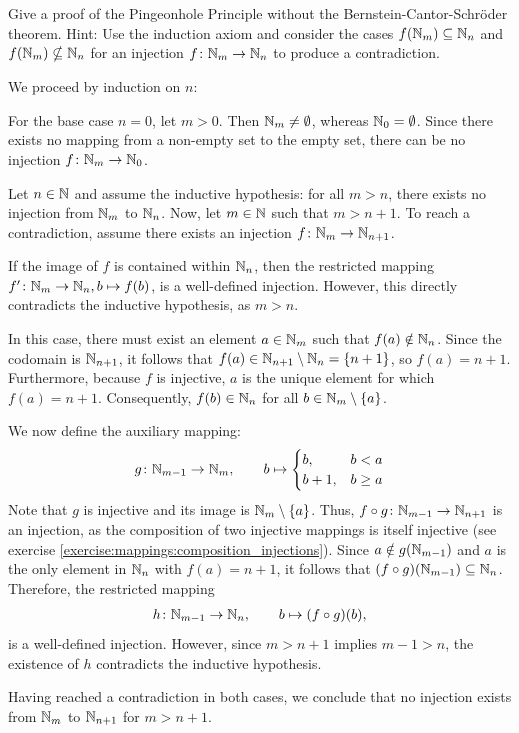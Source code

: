 \begin{exercise}\label{exercise:finite_infinite:pigeonhole_principle}
    Give a proof of the Pingeonhole Principle without the Bernstein-Cantor-Schröder theorem. Hint: Use the induction axiom and consider the cases $f(\mathbb{N}_m)\subseteq\mathbb{N}_n$ and $f(\mathbb{N}_m)\nsubseteq\mathbb{N}_n$ for an injection $f\colon\mathbb{N}_m\to\mathbb{N}_n$ to produce a contradiction.
\end{exercise}

\begin{solution}
    We proceed by induction on $n$:

     For the base case $n=0$, let $m > 0$. Then $\mathbb{N}_m \neq \emptyset$, whereas $\mathbb{N}_0 = \emptyset$. Since there exists no mapping from a non-empty set to the empty set, there can be no injection $f \colon \mathbb{N}_m \to \mathbb{N}_0$.
    
     Let $n \in \mathbb{N}$ and assume the inductive hypothesis: for all $m > n$, there exists no injection from $\mathbb{N}_m$ to $\mathbb{N}_n$. Now, let $m \in \mathbb{N}$ such that $m > n+1$. To reach a contradiction, assume there exists an injection $f \colon \mathbb{N}_m \to \mathbb{N}_{n+1}$.
    
    If the image of $f$ is contained within $\mathbb{N}_n$, then the restricted mapping $f' \colon \mathbb{N}_m \to \mathbb{N}_n, b \mapsto f(b)$, is a well-defined injection. However, this directly contradicts the inductive hypothesis, as $m > n$.
    
     In this case, there must exist an element $a \in \mathbb{N}_m$ such that $f(a) \notin \mathbb{N}_n$. Since the codomain is $\mathbb{N}_{n+1}$, it follows that $f(a) \in \mathbb{N}_{n+1} \setminus \mathbb{N}_n = \{n+1\}$, so $f(a) = n+1$. Furthermore, because $f$ is injective, $a$ is the unique element for which $f(a) = n+1$. Consequently, $f(b) \in \mathbb{N}_n$ for all $b \in \mathbb{N}_m \setminus \{a\}$.
    
    We now define the auxiliary mapping: \begin{align}g \colon \mathbb{N}_{m-1} \rightarrow \mathbb{N}_m, \qquad b \mapsto \begin{cases} b, & b < a \\ b+1, & b \geq a \end{cases}\end{align} Note that $g$ is injective and its image is $\mathbb{N}_m \setminus \{a\}$. Thus, $f \circ g \colon \mathbb{N}_{m-1} \to \mathbb{N}_{n+1}$ is an injection, as the composition of two injective mappings is itself injective (see exercise \ref{exercise:mappings:composition_injections}). Since $a \notin g(\mathbb{N}_{m-1})$ and $a$ is the only element in $\mathbb{N}_n$ with $f(a)=n+1$, it follows that $(f \circ g)(\mathbb{N}_{m-1}) \subseteq \mathbb{N}_n$. Therefore, the restricted mapping \begin{align}h \colon \mathbb{N}_{m-1} \rightarrow \mathbb{N}_n,\qquad b \mapsto (f \circ g)(b),\end{align} is a well-defined injection. However, since $m > n+1$ implies $m-1 > n$, the existence of $h$ contradicts the inductive hypothesis.
    
    Having reached a contradiction in both cases, we conclude that no injection exists from $\mathbb{N}_m$ to $\mathbb{N}_{n+1}$ for $m > n+1$.
\end{solution}
